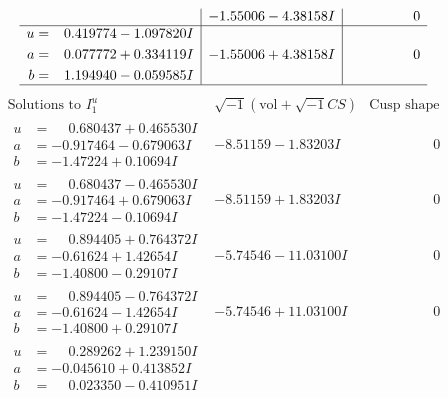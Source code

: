 \documentclass[1p]{elsarticle_modified}
\theoremstyle{definition}
\newcommand{\I}{\sqrt{-1}}
\begin{document}
$$\begin{array}{c|c|c}
 & -1.55006 - 4.38158 I & \phantom{-0.000000 } 0 \\ \hline\begin{aligned}
u &= \phantom{-}0.419774 - 1.097820 I \\
a &= \phantom{-}0.077772 + 0.334119 I \\
b &= \phantom{-}1.194940 - 0.059585 I\end{aligned}
 & -1.55006 + 4.38158 I & \phantom{-0.000000 } 0\\
 \hline 
 \end{array}$$\newpage$$\begin{array}{c|c|c}  
\text{Solutions to }I^u_{1}& \I (\text{vol} + \sqrt{-1}CS) & \text{Cusp shape}\\
 \hline 
\begin{aligned}
u &= \phantom{-}0.680437 + 0.465530 I \\
a &= -0.917464 - 0.679063 I \\
b &= -1.47224 + 0.10694 I\end{aligned}
 & -8.51159 - 1.83203 I & \phantom{-0.000000 } 0 \\ \hline\begin{aligned}
u &= \phantom{-}0.680437 - 0.465530 I \\
a &= -0.917464 + 0.679063 I \\
b &= -1.47224 - 0.10694 I\end{aligned}
 & -8.51159 + 1.83203 I & \phantom{-0.000000 } 0 \\ \hline\begin{aligned}
u &= \phantom{-}0.894405 + 0.764372 I \\
a &= -0.61624 + 1.42654 I \\
b &= -1.40800 - 0.29107 I\end{aligned}
 & -5.74546 - 11.03100 I & \phantom{-0.000000 } 0 \\ \hline\begin{aligned}
u &= \phantom{-}0.894405 - 0.764372 I \\
a &= -0.61624 - 1.42654 I \\
b &= -1.40800 + 0.29107 I\end{aligned}
 & -5.74546 + 11.03100 I & \phantom{-0.000000 } 0 \\ \hline\begin{aligned}
u &= \phantom{-}0.289262 + 1.239150 I \\
a &= -0.045610 + 0.413852 I \\
b &= \phantom{-}0.023350 - 0.410951 I\end{aligned}

\end{array}$$
\end{document}
